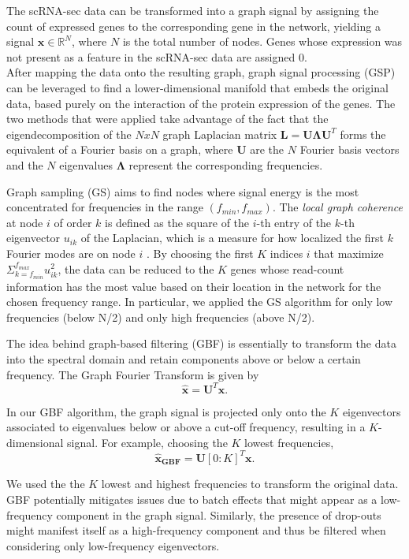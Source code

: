 \documentclass[10pt,conference,compsocconf]{IEEEtran}
\begin{document}
The scRNA-sec data can be transformed into a graph signal by assigning the count of expressed genes to the corresponding gene in the network, yielding a signal $\boldsymbol{x} \in \mathbb{R}^N$, where $N$ is the total number of nodes. Genes whose expression was not present as a feature in the scRNA-sec data are assigned 0. \\
After mapping the data onto the resulting graph, graph signal processing (GSP) can be leveraged to find a lower-dimensional manifold that embeds the original data, based purely on the interaction of the protein expression of the genes. The two methods that were applied take advantage of the fact that the eigendecomposition of the $N x N$ graph Laplacian matrix $\boldsymbol{L} = \boldsymbol{U\Lambda U}^T$ forms the equivalent of a Fourier basis on a graph, where $\boldsymbol{U}$ are the $N$ Fourier basis vectors and the $N$ eigenvalues $\boldsymbol{\Lambda}$ represent the corresponding frequencies.
 \par
Graph sampling (GS) aims to find nodes where signal energy is the most concentrated for frequencies in the range $(f_{min}, f_{max})$. The \textit{local graph coherence} at node $i$ of order $k$ is defined as the square of the $i$-th entry of the $k$-th eigenvector $u_{ik}$ of the Laplacian, which is a measure for how localized the first $k$ Fourier modes are on node $i$ \cite{Puy2018}. By choosing the first $K$ indices $i$ that maximize $\Sigma_{k=f_{min}}^{f_{max}} u_{ik}^2$, the data can be reduced to the $K$ genes whose read-count information has the most value based on their location in the network for the chosen frequency range. In particular, we applied the GS algorithm for only low frequencies (below N/2) and only high frequencies (above N/2). 
\par
The idea behind graph-based filtering (GBF) is essentially to transform the data into the spectral domain and retain components above or below a certain frequency. The Graph Fourier Transform is given by
\begin{equation}
\boldsymbol{\hat{x}} = \boldsymbol{U}^T \boldsymbol{x}.
\end{equation}
\par
In our GBF algorithm, the graph signal is projected only onto the $K$ eigenvectors associated to eigenvalues below or above a cut-off frequency, resulting in a $K$-dimensional signal. For example, choosing the $K$ lowest frequencies,
\begin{equation}
\boldsymbol{\hat{x}_{GBF}} = \boldsymbol{U}[0:K]^T \boldsymbol{x}.
\end{equation} 
\par
We used the the $K$ lowest and highest frequencies to transform the original data. GBF potentially mitigates issues due to batch effects that might appear as a low-frequency component in the graph signal. Similarly, the presence of drop-outs might manifest itself as a high-frequency component and thus be filtered when considering only low-frequency eigenvectors.
\end{document}
